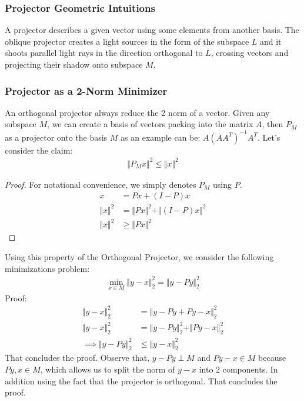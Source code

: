 \documentclass[]{article}
\theoremstyle{definition}
\begin{document}
            \subsubsection{Projector Geometric Intuitions}
                A projector describes a given vector using some elements from another basis. The oblique projector creates a light sources in the form of the subspace $L$ and it shoots parallel light rays in the direction orthogonal to $L$, crossing vectors and projecting their shadow onto subspace $M$. 
        \subsubsection{Projector as a 2-Norm Minimizer}
            An orthogonal projector always reduce the 2 norm of a vector. Given any subspace $M$, we can create a basis of vectors packing into the matrix $A$, then $P_M$ as a projector onto the basis $M$ as an example can be: $A(AA^T)^{-1}A^T$. Let's consider the claim: 
            \begin{align}
                \Vert P_Mx\Vert^2 \le \Vert x\Vert^2
            \end{align}
            \begin{proof}
                For notational convenience, we simply denotes $P_M$ using $P$. 
                \begin{align}
                    x &= Px + (I - P)x 
                    \\
                    \Vert x\Vert^2 &= \Vert Px\Vert^2 + \Vert (I - P)x\Vert^2
                    \\
                    \Vert x\Vert^2 &\ge \Vert Px\Vert^2
                \end{align}    
            \end{proof}
            Using this property of the Orthogonal Projector, we consider the following minimizations problem: 
            \begin{align}
                \min_{x\in M} \Vert y - x\Vert_2^2 = \Vert y - Py\Vert_2^2
            \end{align}
            Proof:
            \begin{align}
                \Vert y - x\Vert_2^2 &= 
                \Vert y - Py + Py - x\Vert_2^2
                \\
                \Vert y - x\Vert_2^2 &= 
                \Vert y - Py\Vert_2^2 + \Vert Py - x\Vert_2^2
                \\
                \implies 
                \Vert y - Py\Vert_2^2 &\le \Vert y - x\Vert_2^2
            \end{align}
            That concludes the proof. Observe that, $y - Py\perp M$ and $Py - x \in M$ because $Py, x \in M$, which allows us to split the norm of $y - x$ into 2 components. In addition using the fact that the projector is orthogonal. That concludes the proof. 
\end{document}
